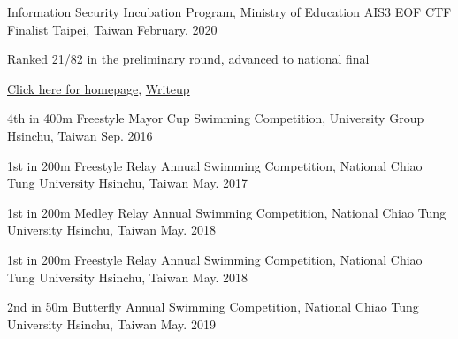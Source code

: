 \begin{cventries}
\cventry
    {Information Security Incubation Program, Ministry of Education} %
    {AIS3 EOF CTF Finalist} %
    {Taipei, Taiwan} %
    {February. 2020} %
    {
      \begin{cvitems} %
        \item {Ranked 21/82 in the preliminary round, advanced to national final}
        \item {\href{https://ais3.org/eof/Home/FinalResult}{Click here for homepage}, \href{https://github.com/Alfons0329/CS_Fall_2019/tree/master/Final_CTF}{Writeup}}
      \end{cvitems}
    }
\end{cventries}

\begin{cvhonors}

  \cvhonor
    {4th in 400m Freestyle} %
    {Mayor Cup Swimming Competition, University Group} %
    {Hsinchu, Taiwan} %
    {Sep. 2016} %

  \cvhonor
    {1st in 200m Freestyle Relay} %
    {Annual Swimming Competition, National Chiao Tung University} %
    {Hsinchu, Taiwan} %
    {May. 2017} %

  \cvhonor
    {1st in 200m Medley Relay} %
    {Annual Swimming Competition, National Chiao Tung University} %
    {Hsinchu, Taiwan} %
    {May. 2018} %
    
  \cvhonor
    {1st in 200m Freestyle Relay} %
    {Annual Swimming Competition, National Chiao Tung University} %
    {Hsinchu, Taiwan} %
    {May. 2018} %
    
  \cvhonor
    {2nd in 50m Butterfly} %
    {Annual Swimming Competition, National Chiao Tung University} %
    {Hsinchu, Taiwan} %
    {May. 2019} %
    
\end{cvhonors}
